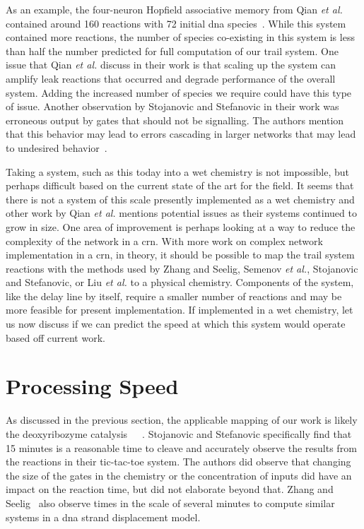 As an example, the four-neuron Hopfield associative memory from Qian \textit{et al.} contained around 160 reactions with 72 initial \gls{dna} species~\cite{Qian2011-nw}. While this system contained more reactions, the number of species co-existing in this system is less than half the number predicted for full computation of our trail system. One issue that Qian \textit{et al.} discuss in their work is that scaling up the system can amplify leak reactions that occurred and degrade performance of the overall system. Adding the increased number of species we require could have this type of issue. Another observation by Stojanovic and Stefanovic in their work was erroneous output by gates that should not be signalling. The authors mention that this behavior may lead to errors cascading in larger networks that may lead to undesired behavior~\cite{Stojanovic2003-eg}.

Taking a system, such as this today into a wet chemistry is not impossible, but perhaps difficult based on the current state of the art for the field. It seems that there is not a system of this scale presently implemented as a wet chemistry and other work by Qian \textit{et al.} mentions potential issues as their systems continued to grow in size. One area of improvement is perhaps looking at a way to reduce the complexity of the network in a \gls{crn}. With more work on complex network implementation in a \gls{crn}, in theory, it should be possible to map the trail system reactions with the methods used by Zhang and Seelig, Semenov \textit{et al.}, Stojanovic and Stefanovic, or Liu \textit{et al.} to a physical chemistry. Components of the system, like the delay line by itself, require a smaller number of reactions and may be more feasible for present implementation. If implemented in a wet chemistry, let us now discuss if we can predict the speed at which this system would operate based off current work.

\section{Processing Speed}
As discussed in the previous section, the applicable mapping of our work is likely the deoxyribozyme catalysis~\cite{Stojanovic2003-eg}~\cite{Stojanovic2000-qx}~\cite{Liu2009-jz}. Stojanovic and Stefanovic specifically find that 15 minutes is a reasonable time to cleave and accurately observe the results from the reactions in their tic-tac-toe system. The authors did observe that changing the size of the gates in the chemistry or the concentration of inputs did have an impact on the reaction time, but did not elaborate beyond that. Zhang and Seelig~\cite{Zhang2011-ey} also observe times in the scale of several minutes to compute similar systems in a \gls{dna} strand displacement model.

